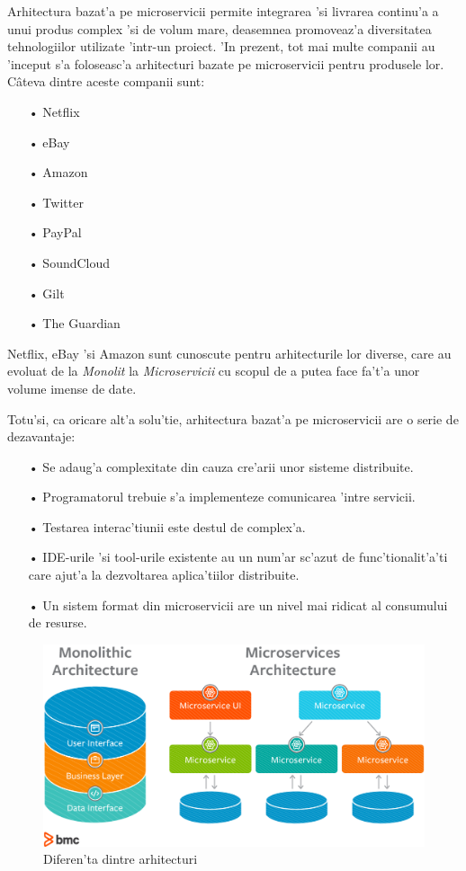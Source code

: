 \documentclass[12pt,a4paper,twoside]{report}
\begin{document}
Arhitectura bazat'a pe microservicii permite integrarea 'si livrarea continu'a a unui produs complex 'si de volum mare, deasemnea promoveaz'a diversitatea tehnologiilor utilizate 'intr-un proiect.
'In prezent, tot mai multe companii au 'inceput s'a foloseasc'a arhitecturi bazate pe microservicii pentru produsele lor. Câteva dintre aceste companii sunt\cite{microservice_companies}:
\begin{itemize}
\item[•] Netflix
\item[•] eBay
\item[•] Amazon
\item[•] Twitter
\item[•] PayPal
\item[•] SoundCloud
\item[•] Gilt
\item[•] The Guardian
\end{itemize}
Netflix, eBay 'si Amazon sunt cunoscute pentru arhitecturile lor diverse, care au evoluat de la \textit{Monolit} la \textit{Microservicii} cu scopul de a putea face fa't'a unor volume imense de date.

Totu'si, ca oricare alt'a solu'tie, arhitectura bazat'a pe microservicii are o serie de dezavantaje\cite{microservices_io}:
\begin{itemize}
\item[•] Se adaug'a complexitate din cauza cre'arii unor sisteme distribuite.
\item[•] Programatorul trebuie s'a implementeze comunicarea 'intre servicii.
\item[•] Testarea interac'tiunii este destul de complex'a.
\item[•] IDE-urile 'si tool-urile existente au un num'ar sc'azut de  func'tionalit'a'ti care ajut'a la dezvoltarea aplica'tiilor distribuite.
\item[•] Un sistem format din microservicii are un nivel mai ridicat al consumului de resurse.
\end{itemize}

\begin{figure}[H]
\begin{center}
\advance\leftskip-3cm
\advance\rightskip-3cm
\includegraphics[keepaspectratio=true,scale=0.35]{img/microservices-vs-monolithic.png}
\caption{Diferen'ta dintre arhitecturi}
\label{microservices_vs_monolithic_arch}
\end{center}
\end{figure} 
\end{document}
